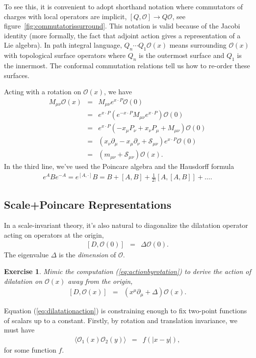 \documentclass{ws-rv9x6}
\newcommand\be{\begin{eqnarray}}
\newcommand\ee{\end{eqnarray}}
\newcommand\cO{\mathcal{O}}
\newcommand\ptl\partial
\newcommand\<\langle
\renewcommand\>\rangle
\newcommand\nn{\nonumber}
\renewcommand\.{\cdot}
\newcommand\cS{\mathcal{S}}
\newtheorem{exercise}{Exercise}[section]
\begin{document}
To see this, it is convenient to adopt shorthand notation where commutators of charges with local operators are implicit, $[Q,\cO] \to Q \cO$, see figure~\ref{fig:commutatorissurround}.  This notation is valid because of the Jacobi identity (more formally, the fact that adjoint action gives a representation of a Lie algebra).  In path integral language, $Q_n\cdots Q_1 \cO(x)$ means surrounding $\cO(x)$ with topological surface operators where $Q_n$ is the outermost surface and $Q_1$ is the innermost.  The conformal commutation relations tell us how to re-order these surfaces.

Acting with a rotation on $\cO(x)$, we have
\be
M_{\mu\nu}\cO(x) &=& M_{\mu\nu}e^{x\.P}\cO(0) \nn\\
&=& e^{x\.P}(e^{-x\.P} M_{\mu\nu} e^{x\.P})\cO(0)\nn\\
&=& e^{x\.P}(-x_\mu P_\nu + x_\nu P_\mu+M_{\mu\nu})\cO(0)\nn\\
&=& (x_\nu \ptl_\mu - x_\mu\ptl_\nu+\cS_{\mu\nu})e^{x\.P}\cO(0)\nn\\
&=& (m_{\mu\nu}+\cS_{\mu\nu})\cO(x).\label{eq:actionbyrotation}
\ee
In the third line, we've used the Poincare algebra and the Hausdorff formula
\be
e^{A}Be^{-A} = e^{[A,\.]}B
= B+[A,B]+\frac 1 {2!}[A,[A,B]]+\dots.
\ee

\subsection{Scale+Poincare Representations}

In a scale-invariant theory, it's also natural to diagonalize the dilatation operator acting on operators at the origin,
\be
\label{eq:dilatationcondition}
[D,\cO(0)]&=&\Delta \cO(0).
\ee
The eigenvalue $\Delta$ is the {\it dimension\/} of $\cO$.
\begin{exercise}
Mimic the computation (\ref{eq:actionbyrotation}) to derive the action of dilatation on $\cO(x)$ away from the origin,
\be
\label{eq:dilatationaction}
[D,\cO(x)] &=& (x^\mu\ptl_\mu + \Delta)\cO(x).
\ee
\end{exercise}

Equation (\ref{eq:dilatationaction}) is constraining enough to fix two-point functions of scalars up to a constant.  Firstly, by rotation and translation invariance, we must have
\be
\<\cO_1(x)\cO_2(y)\>&=&f(|x-y|),
\ee
for some function $f$.
\end{document}
